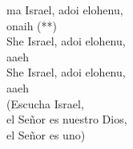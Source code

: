 \begin{cancion}%
	ma Israel, adoi elohenu, \\
	onaih (**)\\
	She Israel, adoi elohenu, \\
	aaeh\\
	She Israel, adoi elohenu, \\
	aaeh\\
(Escucha Israel, \\
 el Señor es nuestro Dios, \\
 el Señor es uno)\\
\end{cancion}%
